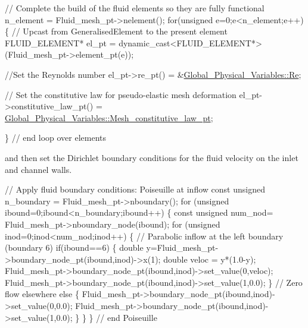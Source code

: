 \begin{DoxyCodeInclude}

 
 \textcolor{comment}{// Complete the build of the fluid elements so they are fully functional}
 n\_element = Fluid\_mesh\_pt->nelement();
 \textcolor{keywordflow}{for}(\textcolor{keywordtype}{unsigned} e=0;e<n\_element;e++)
  \{
   \textcolor{comment}{// Upcast from GeneralisedElement to the present element}
   FLUID\_ELEMENT* el\_pt = 
    \textcolor{keyword}{dynamic\_cast<}FLUID\_ELEMENT*\textcolor{keyword}{>}(Fluid\_mesh\_pt->element\_pt(e));
   
   \textcolor{comment}{//Set the Reynolds number}
   el\_pt->re\_pt() = &\hyperlink{namespaceGlobal__Physical__Variables_ab814e627d2eb5bc50318879d19ab16b9}{Global\_Physical\_Variables::Re};
   
   \textcolor{comment}{// Set the constitutive law for pseudo-elastic mesh deformation}
   el\_pt->constitutive\_law\_pt() =
    \hyperlink{namespaceGlobal__Physical__Variables_aac1b52d0b82bc48d24dfcb031d9dc25f}{Global\_Physical\_Variables::Mesh\_constitutive\_law\_pt};
   
  \} \textcolor{comment}{// end loop over elements}

\end{DoxyCodeInclude}


and then set the Dirichlet boundary conditions for the fluid velocity on the inlet and channel walls.


\begin{DoxyCodeInclude}


 \textcolor{comment}{// Apply fluid boundary conditions: Poiseuille at inflow}
 \textcolor{keyword}{const} \textcolor{keywordtype}{unsigned} n\_boundary = Fluid\_mesh\_pt->nboundary();
 \textcolor{keywordflow}{for} (\textcolor{keywordtype}{unsigned} ibound=0;ibound<n\_boundary;ibound++)
  \{
   \textcolor{keyword}{const} \textcolor{keywordtype}{unsigned} num\_nod= Fluid\_mesh\_pt->nboundary\_node(ibound);
   \textcolor{keywordflow}{for} (\textcolor{keywordtype}{unsigned} inod=0;inod<num\_nod;inod++)
    \{
     \textcolor{comment}{// Parabolic inflow at the left boundary (boundary 6)}
     \textcolor{keywordflow}{if}(ibound==6)
      \{
       \textcolor{keywordtype}{double} y=Fluid\_mesh\_pt->boundary\_node\_pt(ibound,inod)->x(1);
       \textcolor{keywordtype}{double} veloc = y*(1.0-y);
       Fluid\_mesh\_pt->boundary\_node\_pt(ibound,inod)->set\_value(0,veloc);
       Fluid\_mesh\_pt->boundary\_node\_pt(ibound,inod)->set\_value(1,0.0);
      \}
     \textcolor{comment}{// Zero flow elsewhere}
     \textcolor{keywordflow}{else} 
      \{
       Fluid\_mesh\_pt->boundary\_node\_pt(ibound,inod)->set\_value(0,0.0);
       Fluid\_mesh\_pt->boundary\_node\_pt(ibound,inod)->set\_value(1,0.0);
      \}
    \}
  \} \textcolor{comment}{// end Poiseuille}

\end{DoxyCodeInclude}


